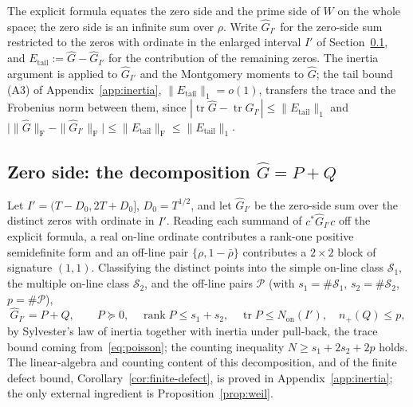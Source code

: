\documentclass[11pt]{article}
\theoremstyle{definition}
\DeclareMathOperator{\tr}{tr}
\DeclareMathOperator{\rank}{rank}
\newcommand{\F}{\mathrm{F}}
\newcommand{\cS}{\mathcal{S}}
\newcommand{\cP}{\mathcal{P}}
\begin{document}
The explicit formula equates the zero side and the prime side of $W$ on the whole
space; the zero side is an infinite sum over $\rho$. Write $\widehat G_{I'}$ for
the zero-side sum restricted to the zeros with ordinate in the enlarged interval
$I'$ of Section~\ref{sec:zeroside}, and $E_{\mathrm{tail}}:=\widehat G-\widehat G_{I'}$
for the contribution of the remaining zeros. The inertia argument is applied to
$\widehat G_{I'}$ and the Montgomery moments to $\widehat G$; the tail bound (A3)
of Appendix~\ref{app:inertia}, $\|E_{\mathrm{tail}}\|_1=o(1)$, transfers the
trace and the Frobenius norm between them, since
$|\tr\widehat G-\tr\widehat G_{I'}|\le\|E_{\mathrm{tail}}\|_1$ and
$\big|\|\widehat G\|_{\F}-\|\widehat G_{I'}\|_{\F}\big|\le\|E_{\mathrm{tail}}\|_{\F}\le\|E_{\mathrm{tail}}\|_1$.

\subsection{Zero side: the decomposition \texorpdfstring{$\widehat G=P+Q$}{G = P + Q}}\label{sec:zeroside}
Let $I'=(T-D_0,2T+D_0]$, $D_0=T^{1/2}$, and let $\widehat G_{I'}$ be the
zero-side sum over the distinct zeros with ordinate in $I'$. Reading each summand
of $c^{*}\widehat G_{I'}c$ off the explicit formula, a real on-line ordinate
contributes a rank-one positive semidefinite form and an off-line pair
$\{\rho,1-\bar\rho\}$ contributes a $2\times2$ block of signature $(1,1)$.
Classifying the distinct points into the simple on-line class $\cS_1$, the
multiple on-line class $\cS_2$, and the off-line pairs $\cP$ (with $s_1=\#\cS_1$,
$s_2=\#\cS_2$, $p=\#\cP$),
\[
  \widehat G_{I'}=P+Q,\qquad P\succeq0,\quad \rank P\le s_1+s_2,\quad
  \tr P\le N_{\mathrm{on}}(I'),\quad n_+(Q)\le p,
\]
by Sylvester's law of inertia together with inertia under pull-back, the trace
bound coming from~\eqref{eq:poisson}; the counting inequality $N\ge s_1+2s_2+2p$
holds. The linear-algebra and counting content of this decomposition, and of the
finite defect bound, Corollary~\ref{cor:finite-defect}, is proved in
Appendix~\ref{app:inertia}; the only external ingredient is
Proposition~\ref{prop:weil}.
\end{document}
